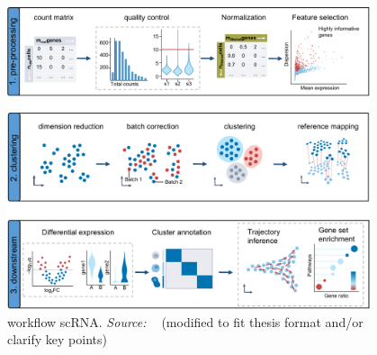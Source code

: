 \begin{figure}[!ht]
	\centering
	\includegraphics[width=0.95\textwidth]{workflow_scRNA/fig}
	\vspace{0.1cm}
	\caption[A common computational scRNA analysis workflow]{workflow scRNA. \emph{Source: ~\cite{heumos2023best}} (modified to fit thesis format and/or clarify key points)}
	\label{fig:workflow_scRNA}
\end{figure}

